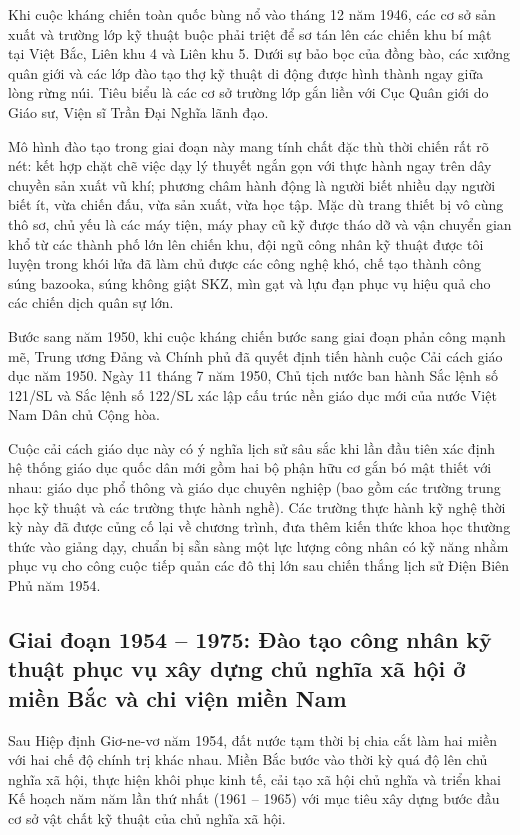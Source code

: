 Khi cuộc kháng chiến toàn quốc bùng nổ vào tháng 12 năm 1946, các cơ sở sản xuất và trường lớp kỹ thuật buộc phải triệt để sơ tán lên các chiến khu bí mật tại Việt Bắc, Liên khu 4 và Liên khu 5. Dưới sự bảo bọc của đồng bào, các xưởng quân giới và các lớp đào tạo thợ kỹ thuật di động được hình thành ngay giữa lòng rừng núi. Tiêu biểu là các cơ sở trường lớp gắn liền với Cục Quân giới do Giáo sư, Viện sĩ Trần Đại Nghĩa lãnh đạo. 

Mô hình đào tạo trong giai đoạn này mang tính chất đặc thù thời chiến rất rõ nét: kết hợp chặt chẽ việc dạy lý thuyết ngắn gọn với thực hành ngay trên dây chuyền sản xuất vũ khí; phương châm hành động là người biết nhiều dạy người biết ít, vừa chiến đấu, vừa sản xuất, vừa học tập. Mặc dù trang thiết bị vô cùng thô sơ, chủ yếu là các máy tiện, máy phay cũ kỹ được tháo dỡ và vận chuyển gian khổ từ các thành phố lớn lên chiến khu, đội ngũ công nhân kỹ thuật được tôi luyện trong khói lửa đã làm chủ được các công nghệ khó, chế tạo thành công súng bazooka, súng không giật SKZ, mìn gạt và lựu đạn phục vụ hiệu quả cho các chiến dịch quân sự lớn.

Bước sang năm 1950, khi cuộc kháng chiến bước sang giai đoạn phản công mạnh mẽ, Trung ương Đảng và Chính phủ đã quyết định tiến hành cuộc Cải cách giáo dục năm 1950. Ngày 11 tháng 7 năm 1950, Chủ tịch nước ban hành Sắc lệnh số 121/SL và Sắc lệnh số 122/SL xác lập cấu trúc nền giáo dục mới của nước Việt Nam Dân chủ Cộng hòa. 

Cuộc cải cách giáo dục này có ý nghĩa lịch sử sâu sắc khi lần đầu tiên xác định hệ thống giáo dục quốc dân mới gồm hai bộ phận hữu cơ gắn bó mật thiết với nhau: giáo dục phổ thông và giáo dục chuyên nghiệp (bao gồm các trường trung học kỹ thuật và các trường thực hành nghề). Các trường thực hành kỹ nghệ thời kỳ này đã được củng cố lại về chương trình, đưa thêm kiến thức khoa học thường thức vào giảng dạy, chuẩn bị sẵn sàng một lực lượng công nhân có kỹ năng nhằm phục vụ cho công cuộc tiếp quản các đô thị lớn sau chiến thắng lịch sử Điện Biên Phủ năm 1954.

\subsection{Giai đoạn 1954 -- 1975: Đào tạo công nhân kỹ thuật phục vụ xây dựng chủ nghĩa xã hội ở miền Bắc và chi viện miền Nam}

Sau Hiệp định Giơ-ne-vơ năm 1954, đất nước tạm thời bị chia cắt làm hai miền với hai chế độ chính trị khác nhau. Miền Bắc bước vào thời kỳ quá độ lên chủ nghĩa xã hội, thực hiện khôi phục kinh tế, cải tạo xã hội chủ nghĩa và triển khai Kế hoạch năm năm lần thứ nhất (1961 -- 1965) với mục tiêu xây dựng bước đầu cơ sở vật chất kỹ thuật của chủ nghĩa xã hội. 

